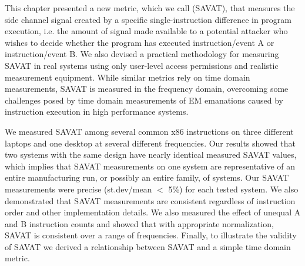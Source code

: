

This chapter presented a new metric, which we call \SAVATfull (SAVAT), that measures the side channel signal created by a specific single-instruction difference in program execution, i.e. the amount of signal made available to a potential attacker who wishes to decide whether the program has executed instruction/event A or instruction/event B. We also devised a practical methodology for measuring SAVAT in real systems using only user-level access permissions and realistic measurement equipment. While similar metrics rely on time domain measurements, SAVAT is measured in the frequency domain, overcoming some challenges posed by time domain measurements of EM emanations caused by instruction execution in high performance systems. 

We measured SAVAT among several common x86 instructions on three different laptops and one desktop at several different frequencies. Our results showed that two systems with the same design have nearly identical measured SAVAT values, which implies that SAVAT measurements on one system are representative of an entire manufacturing run, or possibly an entire family, of systems. Our SAVAT measurements were precise (st.dev/mean $<$ 5\%) for each tested system. We also demonstrated that SAVAT measurements are consistent regardless of instruction order and other implementation details. We also measured the effect of unequal A and B instruction counts and showed that with appropriate normalization, SAVAT is consistent over a range of frequencies. %
Finally, to illustrate the validity of SAVAT we derived a relationship between SAVAT and a simple time domain metric. 



